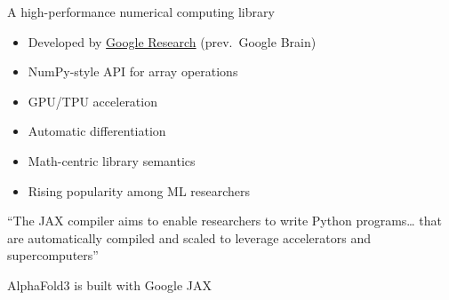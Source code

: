 \begin{frame}
    
    A high-performance numerical computing library 

            \vspace{0.5em}
            \vspace{0.5em}

    \begin{itemize}
        \item Developed by \href{https://research.google/}{Google Research}
            (prev.\ Google Brain)
            \vspace{0.5em}
        \item NumPy-style API for array operations
            \vspace{0.5em}
        \item GPU/TPU acceleration 
            \vspace{0.5em}
        \item Automatic differentiation
            \vspace{0.5em}
        \item Math-centric library semantics
            \vspace{0.5em}
        \item Rising popularity among ML researchers
    \end{itemize}

            \vspace{0.5em}
            \vspace{0.5em}

    ``The JAX compiler aims to enable researchers to write Python programs\ldots
        that are automatically compiled and scaled to leverage accelerators and
        supercomputers''

\end{frame}

\begin{frame}
    
    \Eg AlphaFold3 is built with Google JAX

        \vspace{0.5em}

    \begin{figure}
       \begin{center} %
       \end{center}
    \end{figure}


\end{frame}

